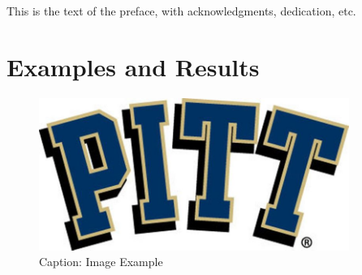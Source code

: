 \documentclass[hidelinks,pdftex,phd]{pittetd}
\begin{document}
\maketitle
\makecommittee
\copyrightpage                     
\begin{abstract}
The abstract of the document.
This document is a sample file for the creation of ETD's at Pitt through \LaTeX.
\end{abstract}

\tableofcontents
\listoftables                      
\listoffigures                
\preface
This is the text of the preface, with acknowledgments, dedication, etc. 
%
%



\appendix     
\chapter{Examples and Results}
\begin{figure}[t]
    \centering
    \includegraphics[width=0.9\textwidth]{Images/Picture-Example.jpg}
    \caption{Caption: Image Example}
    
    \label{Reference: Picture Example}
\end{figure}
\end{document}
